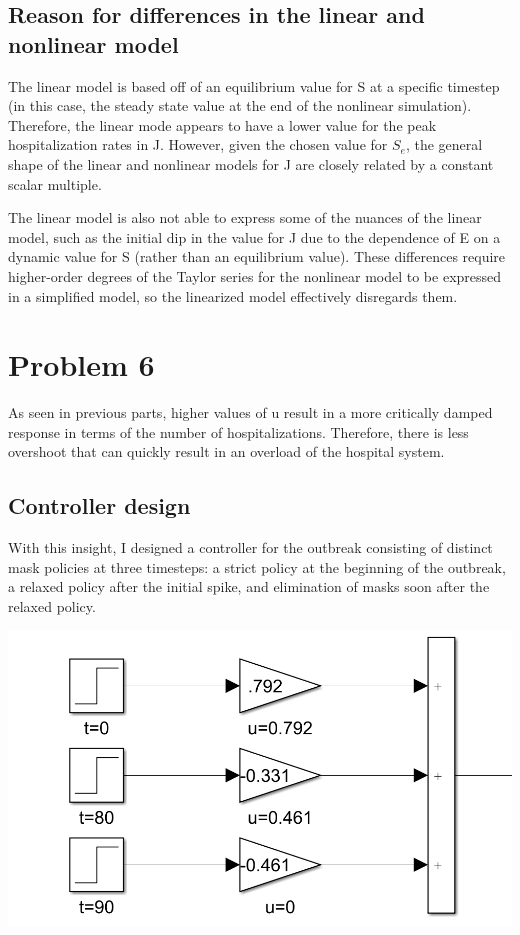 \documentclass[fleqn]{article}
\begin{document}
\subsection*{Reason for differences in the linear and nonlinear model}
The linear model is based off of an equilibrium value for S at a specific timestep (in this case, the steady state value at the end of the nonlinear simulation). Therefore, the linear mode appears to have a lower value for the peak hospitalization rates in J. However, given the chosen value for $S_e$, the general shape of the linear and nonlinear models for J are closely related by a constant scalar multiple.

The linear model is also not able to express some of the nuances of the linear model, such as the initial dip in the value for J due to the dependence of E on a dynamic value for S (rather than an equilibrium value). These differences require higher-order degrees of the Taylor series for the nonlinear model to be expressed in a simplified model, so the linearized model effectively disregards them.

\newpage

\section*{Problem 6}
As seen in previous parts, higher values of u result in a more critically damped response in terms of the number of hospitalizations. Therefore, there is less overshoot that can quickly result in an overload of the hospital system. 

\subsection*{Controller design}
With this insight, I designed a controller for the outbreak consisting of distinct mask policies at three timesteps: a strict policy at the beginning of the outbreak, a relaxed policy after the initial spike, and elimination of masks soon after the relaxed policy.

\begin{center}
    \includegraphics[width=0.5\linewidth]{simulink_mask_policy}
\end{center}
\end{document}
